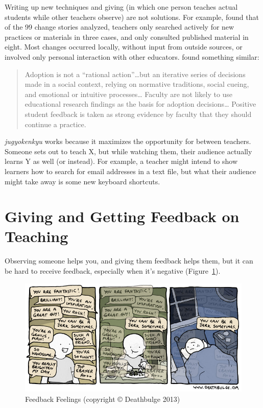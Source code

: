 Writing up new techniques
and giving 
(in which one person teaches actual students while other teachers observe)
are not solutions.
For example,
\cite{Finc2007,Finc2012} found that of the 99 change stories analyzed,
teachers only searched actively for new practices or materials in three cases,
and only consulted published material in eight.
Most changes occurred locally,
without input from outside sources,
or involved only personal interaction with other educators.
\cite{Bark2015} found something similar:

\begin{quote}

  Adoption is not a ``rational action''{\ldots}but
  an iterative series of decisions made in a social context,
  relying on normative traditions, social cueing,
  and emotional or intuitive processes{\ldots}
  Faculty are not likely to use educational research findings
  as the basis for adoption decisions{\ldots}
  Positive student feedback is taken as strong evidence by faculty
  that they should continue a practice.

\end{quote}

\emph{jugyokenkyu} works because it maximizes the opportunity for
 between teachers.
Someone sets out to teach X,
but while watching them,
their audience actually learns Y as well (or instead).
For example,
a teacher might intend to show learners how to search for email addresses in a text file,
but what their audience might take away is some new keyboard shortcuts.

\section{Giving and Getting Feedback on Teaching}\label{s:performance-feedback}

Observing someone helps you,
and giving them feedback helps them,
but it can be hard to receive feedback,
especially when it's negative (Figure~\ref{f:performance-feedback-feelings}).

\begin{figure}
\centering
\includegraphics{../../figures/deathbulge-jerk.jpg}
\caption{Feedback Feelings (copyright © Deathbulge 2013)}
\label{f:performance-feedback-feelings}
\end{figure}

